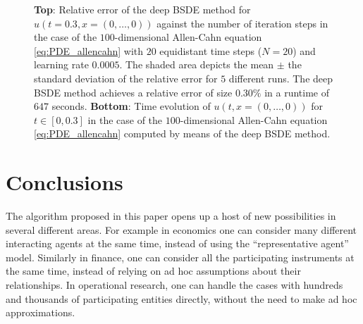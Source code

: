 \documentclass[11pt,english]{article}
\begin{document}
\begin{figure}[ht]
\centering
\setcounter{subfigure}{0}
\caption{\textbf{Top}: Relative error of the deep BSDE method for $u(t{=}0.3,x{=}(0,\dots,0))$ against the number of iteration steps in the case of the $ 100 $-dimensional Allen-Cahn equation \eqref{eq:PDE_allencahn} with $ 20 $ equidistant time steps ($ N{=}20 $) and learning rate $ 0.0005 $.
The shaded area depicts the mean $\pm$ the standard deviation of the relative error for $ 5 $ different runs. The deep BSDE method achieves a relative error of size $ 0.30\% $ in a runtime of $ 647 $ seconds. 
\textbf{Bottom}: Time evolution of $u(t,x{=}(0,\dots,0))$ for $t\in[0,0.3]$ in the case of the $ 100 $-dimensional Allen-Cahn equation \eqref{eq:PDE_allencahn} computed
by means of the deep BSDE method.
\label{fig:allen_cahn}}
\end{figure}


\section*{\label{sec4}Conclusions}

The algorithm proposed in this paper opens up a host of new possibilities in several
different areas. For example in economics one can consider many different interacting
agents at the same time, instead of using the ``representative agent'' model.
Similarly in finance, one can consider all the participating instruments at the same time,
instead of relying on ad hoc assumptions about their relationships.
In operational research, one can handle 
the cases with hundreds and thousands of participating entities directly, without the need
to make ad hoc approximations.
\end{document}

